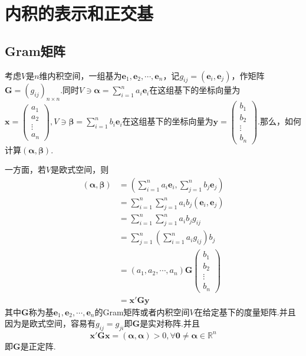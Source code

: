 \newpage
\section{内积的表示和正交基}
\subsection{Gram矩阵}
考虑$V$是$n$维内积空间，一组基为$\bm{e}_1,\bm{e}_2,\cdots,\bm{e}_n$，记$g_{ij}=\left(\bm{e}_i,\bm{e}_j\right)$，作矩阵$\bm{G}=\left(g_{ij}\right)_{n\times n}$.同时$\displaystyle V\ni\bm{\alpha}=\sum_{i=1}^{n}a_i\bm{e}_i$在这组基下的坐标向量为$\displaystyle\bm{x}=\begin{pmatrix}
        a_1 \\a_2\\\vdots\\a_n
    \end{pmatrix},V\ni\bm{\beta}=\sum_{i=1}^{n}b_i\bm{e}_i$在这组基下的坐标向量为$\displaystyle\bm{y}=\begin{pmatrix}
        b_1 \\b_2\\\vdots\\b_n
    \end{pmatrix}$.那么，如何计算$\left(
    \bm{\alpha},\bm{\beta}
    \right)$.

一方面，若$V$是欧式空间，则\begin{align*}
    \left(
    \bm{\alpha},\bm{\beta}
    \right) & =\left(
    \sum_{i=1}^{n}a_i\bm{e}_i,\sum_{j=1}^{n}b_j\bm{e}_j
    \right)                                             \\
            & =\sum_{i=1}^{n}\sum_{j=1}^{n}a_ib_j\left(
    \bm{e}_i,\bm{e}_j
    \right)                                             \\
            & =\sum_{i=1}^{n}\sum_{j=1}^{n}a_ib_jg_{ij} \\
            & =\sum_{j=1}^{n}\left(
    \sum_{i=1}^{n}a_ig_{ij}
    \right)b_j                                          \\
            & =\left(
    a_1,a_2,\cdots,a_n
    \right)\bm{G}\begin{pmatrix}
                     b_1 \\b_2\\\vdots\\b_n
                 \end{pmatrix}                  \\
            & =\bm{x}'\bm{G}\bm{y}
\end{align*}其中$\bm{G}$称为基$\bm{e}_1,\bm{e}_2,\cdots,\bm{e}_n$的Gram矩阵或者内积空间$V$在给定基下的度量矩阵.并且因为是欧式空间，容易有$g_{ij}=g_{ji}$即$\bm{G}$是实对称阵.并且\[
    \bm{x}'\bm{Gx}=\left(
    \bm{\alpha},\bm{\alpha}
    \right)>0,\forall\bm{0}\neq\bm{\alpha}\in \mathbb{R}^n
\]即$\bm{G}$是正定阵.

